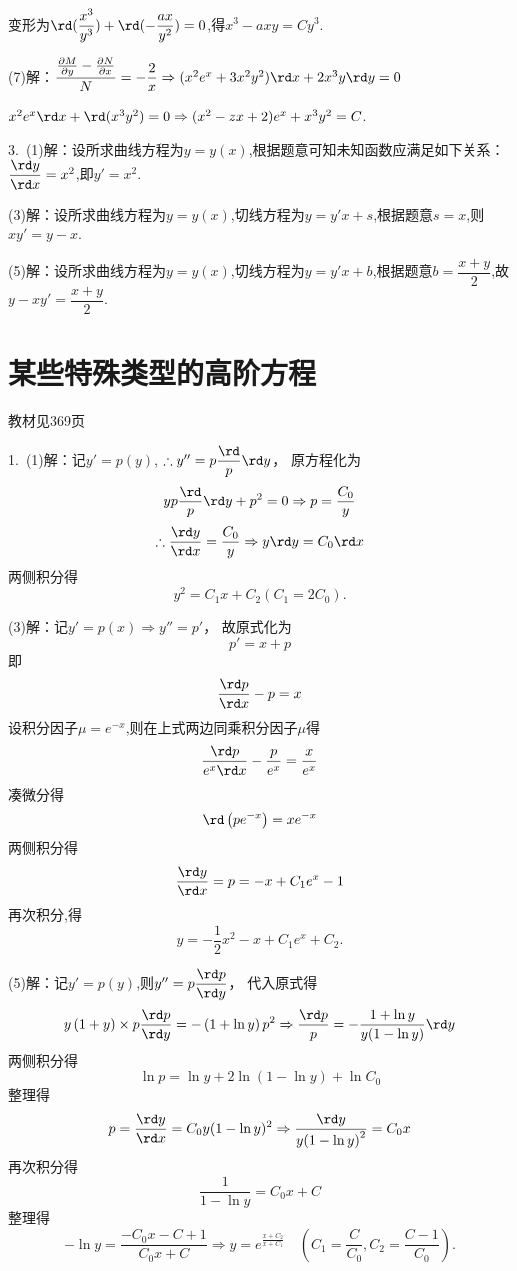   变形为$\rd (\dfrac{x^3}{y^3})+\rd (-\dfrac{ax}{y^2})=0$,得$x^3-axy=Cy^3$.

  (7)解：$\dfrac{\frac{{\partial M}}{{\partial y}} - \frac{{\partial N}}{{\partial x}}}{N}=-\dfrac{2}{x} \Rightarrow (x^2e^x+3x^2y^2)\rd x+2x^3y\rd y=0$

  $x^2e^x\rd x+\rd (x^3y^2)=0 \Rightarrow (x^2-zx+2)e^x+x^3y^2=C$.

  3.~(1)解：设所求曲线方程为$y=y(x)$,根据题意可知未知函数应满足如下关系：$\dfrac{\rd y}{\rd x}=x^2$,即$y'=x^2$.

  (3)解：设所求曲线方程为$y=y(x)$,切线方程为$y=y'x+s$,根据题意$s=x$,则$xy'=y-x$.

  (5)解：设所求曲线方程为$y=y(x)$,切线方程为$y=y'x+b$,根据题意$b=\dfrac{x+y}{2}$,故$y-xy'=\dfrac{x+y}{2}$.


\section{某些特殊类型的高阶方程}
\begin{flushright}
  \color{zhanqing!80}
   教材见369页
\end{flushright}
  1.~(1)解：记$y'=p\left( y \right)$, $\therefore y''=p\dfrac\rd p\rd y$，
  原方程化为\[yp\dfrac\rd p\rd y+{{p}^{2}}=0 \Rightarrow p=\dfrac{{{C}_{0}}}{y}\]
  \[\therefore \dfrac{\rd y}{\rd x}=\dfrac{{{C}_{0}}}{y}\Rightarrow y\rd y={{C}_{0}}\rd x\]
  两侧积分得\[{{y}^{2}}={{C}_{1}}x+{{C}_{2}}\left( {{C}_{1}}=2{{C}_{0}} \right).\]

  (3)解：记$ y' = p\left( x \right) \Rightarrow y'' = p'$，
  故原式化为\[p' = x + p\]
  即\[\dfrac {\rd p}{\rd x} - p = x \]
  设积分因子$\mu  = {e^{ - x}}$,则在上式两边同乘积分因子$ \mu $得
  \[\dfrac{{\rd p}}{{{e^x}\rd x}} - \dfrac{p}{{{e^x}}} = \dfrac{x}{{{e^x}}}\]
  凑微分得\[\rd \left( {p{e^{ - x}}} \right) = x{e^{ - x}}\]
  两侧积分得\[\dfrac{{\rd y}}{{\rd x}} = p =  - x + {C_1}{e^x} - 1\]
  再次积分,得\[y =  - \dfrac{1}{2}{x^2} - x + {C_1}{e^x} + {C_2}.\]

  (5)解：记$y' = p\left( y \right)$,则$y'' = p\dfrac{{\rd p}}{{\rd y}}$，
  代入原式得
  \[y\left( {1 + y} \right) \times p\dfrac{{\rd p}}{{\rd y}} =  - \left( {1 + \ln y} \right){p^2} \Rightarrow \dfrac{{\rd p}}{p} =  - \dfrac{{1 + \ln y}}{{y(1 - \ln y)}}\rd y\]
  两侧积分得\[\ln p = \ln y + 2\ln (1 - \ln y) + \ln {C_0}\]
  整理得\[ p = \dfrac{{\rd y}}{{\rd x}} = {C_0}y{(1 - \ln y)^2} \Rightarrow \dfrac{{\rd y}}{{y{{(1 - \ln y)}^2}}} = {C_0}x\]
  再次积分得\[\dfrac{1}{{1 - \ln y}} = {C_0}x + C\]
  整理得\[ - \ln y = \dfrac{{ - {C_0}x - C + 1}}{{{C_0}x + C}} \Rightarrow y = {e^{\frac{{x + {C_2}}}{{x + {C_1}}}}} \quad ({C_1} = \dfrac{C}{{{C_0}}},{C_2} = \dfrac{{C - 1}}{{{C_0}}}).\]

